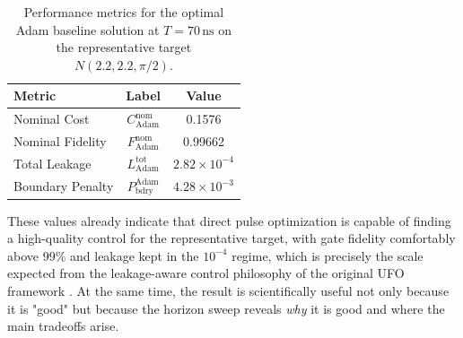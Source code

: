 \begin{table}[ht]
\centering
\begin{tabular}{lcc}
\hline
Metric & Label & Value \\
\hline
Nominal Cost & \(C_{\mathrm{Adam}}^{\mathrm{nom}}\) & 0.1576 \\
Nominal Fidelity & \(F_{\mathrm{Adam}}^{\mathrm{nom}}\) & 0.99662 \\
Total Leakage & \(L_{\mathrm{Adam}}^{\mathrm{tot}}\) & $2.82\times 10^{-4}$ \\
Boundary Penalty & \(P_{\mathrm{bdry}}^{\mathrm{Adam}}\) & $4.28\times 10^{-3}$ \\
\hline
\end{tabular}
\caption{Performance metrics for the optimal Adam baseline solution at \(T=70\,\mathrm{ns}\) on the representative target $N(2.2, 2.2, \pi/2)$.}
\label{tab:adam_best_nominal_results}
\end{table}
These values already indicate that direct pulse optimization is capable of finding a high-quality control for the representative target, with gate fidelity comfortably above \(99\%\) and leakage kept in the \(10^{-4}\) regime, which is precisely the scale expected from the leakage-aware control philosophy of the original UFO framework \cite{Niu2019}. At the same time, the result is scientifically useful not only because it is "good" but because the horizon sweep reveals \emph{why} it is good and where the main tradeoffs arise.

